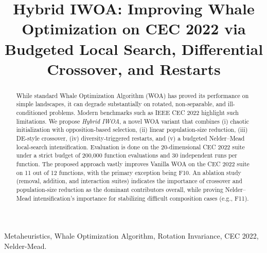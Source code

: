 \documentclass[conference]{IEEEtran}
\begin{document}
\title{Hybrid IWOA: Improving Whale Optimization on CEC 2022 via Budgeted Local Search, Differential Crossover, and Restarts}

\author{
}

\maketitle

\thispagestyle{plain}
\pagestyle{plain}

\begin{abstract}
While standard Whale Optimization Algorithm (WOA) has proved its performance on simple landscapes, it can degrade substantially on rotated, non-separable, and ill-conditioned problems. Modern benchmarks such as IEEE CEC 2022 highlight such limitations. We propose \textit{Hybrid IWOA}, a novel WOA variant that combines (i) chaotic initialization with opposition-based selection, (ii) linear population-size reduction, (iii) DE-style crossover, (iv) diversity-triggered restarts, and (v) a budgeted Nelder--Mead local-search intensification. Evaluation is done on the 20-dimensional CEC 2022 suite under a strict budget of 200{,}000 function evaluations and 30 independent runs per function. The proposed approach vastly improves Vanilla WOA on the CEC 2022 suite on 11 out of 12 functions, with the primary exception being F10. An ablation study (removal, addition, and interaction suites) indicates the importance of crossover and population-size reduction as the dominant contributors overall, while proving Nelder--Mead intensification's importance for stabilizing difficult composition cases (e.g., F11).
\end{abstract}

\begin{IEEEkeywords}
Metaheuristics, Whale Optimization Algorithm, Rotation Invariance, CEC 2022, Nelder-Mead.
\end{IEEEkeywords}
\end{document}
